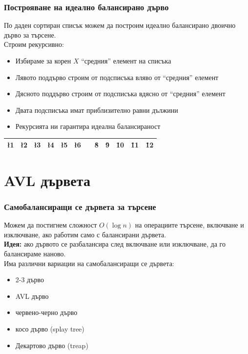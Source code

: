 \documentclass[alsotrans]{beamerswitch}
\begin{document}
\begin{frame}
  \frametitle{Построяване на идеално балансирано дърво}
  По даден сортиран списък можем да построим идеално балансирано двоично дърво за търсене.\\[2ex]
  Строим рекурсивно:
  \begin{itemize}
  \item Избираме за корен $X$ ``средния'' елемент на списъка
  \item Лявото поддърво строим от подсписъка вляво от ``средния'' елемент
  \item Дясното поддърво строим от подсписъка вдясно от ``средния'' елемент
  \item Двата подсписъка имат приблизително равни дължини
  \item Рекурсията ни гарантира идеална балансираност
  \end{itemize}
  \begin{center}
    \begin{tabular}{*{12}{|c}|}
      \hline
      \l1&\l2&\l3&\l4&\l5&\l6&&\r8&\r9&\r10&\r11&\r12\\
      \hline
    \end{tabular}
  \end{center}
\end{frame}

\section{AVL дървета}

\begin{frame}
  \frametitle{Самобалансиращи се дървета за търсене}
  Можем да постигнем сложност $O(\log n)$ на операциите търсене, включване и изключване, ако работим само с балансирани дървета.\\[2ex]
  \pause
  \textbf{Идея:} ако дървото се разбалансира след включване или изключване, да го балансираме наново.\\[2ex]
  \pause
  Има различни вариации на самобалансиращи се дървета:
  \begin{itemize}
  \item 2-3 дърво
  \item<alert@4> AVL дърво
  \item червено-черно дърво
  \item косо дърво (splay tree)
  \item Декартово дърво (treap)
  \end{itemize}
  \pause
\end{frame}
\end{document}
